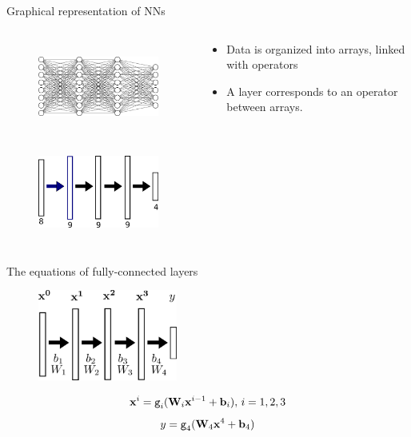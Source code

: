 \documentclass[xcolor=pdftex,dvipsnames,table,mathserif]{beamer}
\begin{document}
\begin{frame}{Graphical representation of NNs}

\begin{columns}
  \begin{column}{.5\textwidth}
    \begin{figure}
      \includegraphics[height=3cm]{mini_reseau3_bis.png}
    \end{figure}
    \begin{figure}
      \includegraphics[height=3cm]{nn_representation}
    \end{figure}
  \end{column}

  \begin{column}{.5\textwidth}
    \begin{itemize}
    \item Data is organized into arrays, linked with operators
    \item A layer corresponds to an operator between arrays.
    \end{itemize}
  \end{column}
\end{columns}

\end{frame}


\begin{frame}{The equations of fully-connected layers}

    \begin{figure}
      \includegraphics[height=3cm]{nn_representation2}
    \end{figure}

    \begin{block}{}
      \[\mathbf{x}^i = \texttt{g}_i(\mathbf{W}_i\mathbf{x}^{i-1} + \mathbf{b}_i),\, i= 1, 2, 3 \]
      \[y = \texttt{g}_4(\mathbf{W}_4\mathbf{x}^4 + \mathbf{b}_4)\]
    \end{block}

\end{frame}
\end{document}
